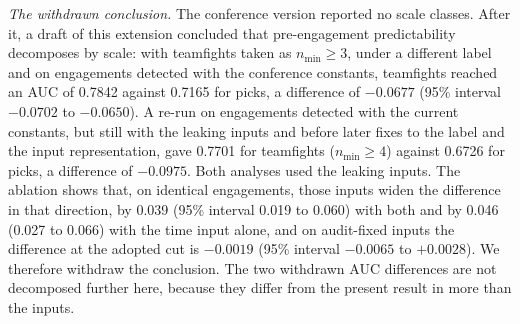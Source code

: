 \emph{The withdrawn conclusion.} The conference version reported no scale classes. After it, a draft of
this extension concluded that pre-engagement predictability decomposes by scale: with teamfights taken as
$n_{\min} \ge 3$, under a different label and on engagements detected with the conference constants,
teamfights reached an AUC of 0.7842 against 0.7165 for picks, a difference of $-0.0677$ (95\% interval
$-0.0702$ to $-0.0650$). A re-run on engagements detected with the current constants, but still with the
leaking inputs and before later fixes to the label and the input representation, gave 0.7701 for
teamfights ($n_{\min} \ge 4$) against 0.6726 for picks, a difference of $-0.0975$. Both analyses used the
leaking inputs. The ablation shows that, on identical engagements, those inputs widen the difference in
that direction, by 0.039 (95\% interval 0.019 to 0.060) with both and by 0.046 (0.027 to 0.066) with the
time input alone, and on audit-fixed inputs the
difference at the adopted cut is $-0.0019$
(95\% interval $-0.0065$ to $+0.0028$). We therefore withdraw the conclusion. The two withdrawn AUC
differences are not decomposed further here, because they differ from the present result in more than
the inputs.

